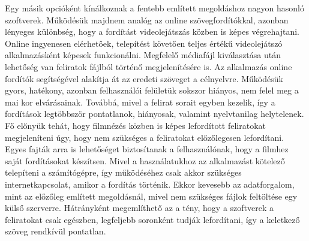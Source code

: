 Egy másik opcióként kínálkoznak a fentebb említett megoldáshoz nagyon hasonló szoftverek. Működésük majdnem analóg az online szövegfordítókkal, azonban lényeges különbség, hogy a fordítást videolejátszás közben is képes végrehajtani. Online ingyenesen elérhetőek, telepítést követően teljes értékű videolejátszó alkalmazásként képesek funkcionálni. Megfelelő médiafájl kiválasztása után lehetőség van feliratok fájlból történő megjelenítésére is. Az alkalmazás online fordítók segítségével alakítja át az eredeti szöveget a célnyelvre. Működésük gyors, hatékony, azonban felhasználói felületük sokszor hiányos, nem felel meg a mai kor elvárásainak. Továbbá, mivel a felirat sorait egyben kezelik, így a fordítások legtöbbször pontatlanok, hiányosak, valamint nyelvtanilag helytelenek. Fő előnyük tehát, hogy filmnézés közben is képes lefordított feliratokat megjeleníteni úgy, hogy nem szükséges a feliratokat előzőlegesen lefordítani. Egyes fajták arra is lehetőséget biztosítanak a felhasználónak, hogy a filmhez saját fordításokat készítsen. Mivel a használatukhoz az alkalmazást kötelező telepíteni a számítógépre, így működéséhez csak akkor szükséges internetkapcsolat, amikor a fordítás történik. Ekkor kevesebb az adatforgalom, mint az előzőleg említett megoldásnál, mivel nem szükséges fájlok feltöltése egy külső szerverre. Hátrányként megemlíthető az a tény, hogy a szoftverek a feliratokat csak egészben, legfeljebb soronként tudják lefordítani, így a keletkező szöveg rendkívül pontatlan.

